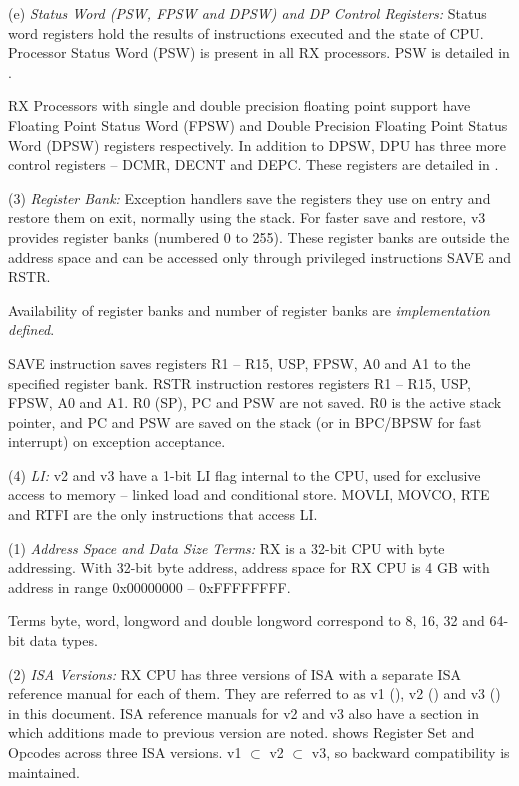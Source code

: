     (e) \emph{Status Word (PSW, FPSW and DPSW) and DP Control Registers:} %
    Status word registers hold the results of instructions executed and the state of CPU. 
    Processor Status Word (PSW) is present in all RX processors. PSW is detailed in 
    .
    
    RX Processors with single and double precision floating point support have Floating 
    Point Status Word (FPSW) and Double Precision Floating Point Status Word (DPSW) registers
    respectively. In addition to DPSW, DPU has three more control registers -- DCMR, DECNT and
    DEPC. These registers are detailed in .

\levelone
(3) \emph{Register Bank:} %
Exception handlers save the registers they use on entry and restore them on exit, normally using 
the stack. For faster save and restore, v3 provides register banks (numbered 0 to 255). These 
register banks are outside the address space and can be accessed only through privileged 
instructions SAVE and RSTR.

Availability of register banks and number of register banks are \emph{implementation defined}.

SAVE instruction saves registers R1 -- R15, USP, FPSW, A0 and A1 to the specified register bank. 
RSTR instruction restores registers R1 -- R15, USP, FPSW, A0 and A1. R0 (SP), PC and PSW are not 
saved. R0 is the active stack pointer, and PC and PSW are saved on the stack (or in BPC/BPSW for 
fast interrupt) on exception acceptance.

(4) \emph{LI:} %
v2 and v3 have a 1-bit LI flag internal to the CPU, used for exclusive access to memory -- 
linked load and conditional store. MOVLI, MOVCO, RTE and RTFI are the only instructions that 
access LI.




\SOPNoteBody

(1) \emph{Address Space and Data Size Terms:} %
RX is a 32-bit CPU with byte addressing. With 32-bit byte address, address space for RX CPU is 
4 GB with address in range 0x00000000 -- 0xFFFFFFFF.

Terms byte, word, longword and double longword correspond to 8, 16, 32 and 64-bit data types.

(2) \emph{ISA Versions:} %
RX CPU has three versions of ISA with a separate ISA reference manual for each of them. They are referred to as 
v1 (\cite{rx_v1_um}), v2 (\cite{rx_v2_um}) and v3 (\cite{rx_v3_um}) in this document. ISA reference manuals for v2 
and v3 also have a section in which additions made to previous version are noted. 
 shows Register Set and Opcodes across three ISA versions. 
v1 $\subset$ v2 $\subset$ v3, so backward compatibility is maintained. 

